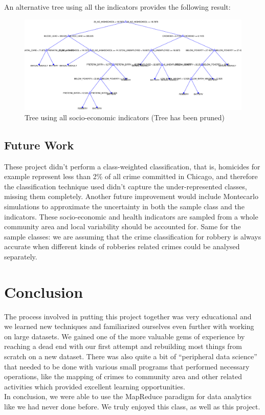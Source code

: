 \documentclass[a4paper,10pt]{article}
\begin{document}
An alternative tree using all the indicators provides the following result:

\begin{figure}[H]
	\includegraphics[width=\linewidth]{media/full_tree.eps}
	\caption{Tree using all socio-economic indicators (Tree has been pruned)}
\end{figure}

\subsection{Future Work}

These project didn't perform a class-weighted classification, that is, homicides for example represent less than 2\% of all crime committed in Chicago, and therefore the classification technique used didn't capture the under-represented classes, missing them completely.
Another future improvement would include Montecarlo simulations to approximate the uncertainty in both the sample class and the indicators. These socio-economic and health indicators are sampled from a whole community area and local variability should be accounted for. Same for the sample classes: we are assuming that the crime classification for robbery is always accurate when different kinds of robberies related crimes could be analysed separately.


\section{Conclusion}

The process involved in putting this project together was very educational and we learned new techniques and familiarized ourselves even further with working on large datasets. We gained one of the more valuable gems of experience by reaching a dead end with our first attempt and rebuilding most things from scratch on a new dataset. There was also quite a bit of “peripheral data science” that needed to be done with various small programs that performed necessary operations, like the mapping of crimes to community area and other related activities which provided excellent learning opportunities.\\

In conclusion, we were able to use the MapReduce paradigm for data analytics like we had never done before. We truly enjoyed this class, as well as this project.

\newpage



\end{document}

